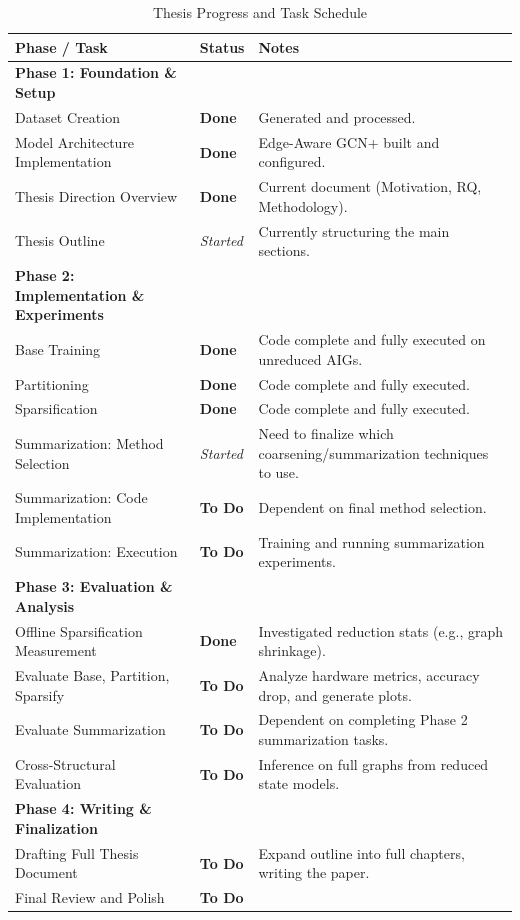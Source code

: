 \documentclass[paper=a4, fontsize=11pt]{scrartcl} %
\numberwithin{equation}{section} %
\numberwithin{figure}{section} %
\numberwithin{table}{section} %
\begin{document}
\begin{table}[htbp]
\centering
\caption{Thesis Progress and Task Schedule}
\label{tab:progress}
\begin{tabular}{@{}llp{8.5cm}@{}}
\toprule
\textbf{Phase / Task} & \textbf{Status} & \textbf{Notes} \\
\midrule
\textbf{Phase 1: Foundation \& Setup} & & \\
Dataset Creation & \textbf{Done} & Generated and processed. \\
Model Architecture Implementation & \textbf{Done} & Edge-Aware GCN+ built and configured. \\
Thesis Direction Overview & \textbf{Done} & Current document (Motivation, RQ, Methodology). \\
Thesis Outline & \textit{Started} & Currently structuring the main sections. \\
\midrule
\textbf{Phase 2: Implementation \& Experiments} & & \\
Base Training & \textbf{Done} & Code complete and fully executed on unreduced AIGs. \\
Partitioning & \textbf{Done} & Code complete and fully executed. \\
Sparsification & \textbf{Done} & Code complete and fully executed. \\
Summarization: Method Selection & \textit{Started} & Need to finalize which coarsening/summarization techniques to use. \\
Summarization: Code Implementation & \textbf{To Do} & Dependent on final method selection. \\
Summarization: Execution & \textbf{To Do} & Training and running summarization experiments. \\
\midrule
\textbf{Phase 3: Evaluation \& Analysis} & & \\
Offline Sparsification Measurement & \textbf{Done} & Investigated reduction stats (e.g., graph shrinkage). \\
Evaluate Base, Partition, Sparsify & \textbf{To Do} & Analyze hardware metrics, accuracy drop, and generate plots. \\
Evaluate Summarization & \textbf{To Do} & Dependent on completing Phase 2 summarization tasks. \\
Cross-Structural Evaluation & \textbf{To Do} & Inference on full graphs from reduced state models. \\
\midrule
\textbf{Phase 4: Writing \& Finalization} & & \\
Drafting Full Thesis Document & \textbf{To Do} & Expand outline into full chapters, writing the paper. \\
Final Review and Polish & \textbf{To Do} & \\
\bottomrule
\end{tabular}
\end{table}
\end{document}
